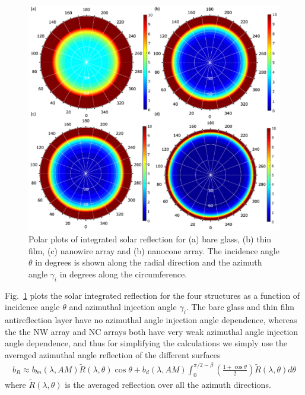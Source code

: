\documentclass[preprint,12pt]{elsarticle}
\begin{document}

\begin{figure}[H]
\vspace{-10pt}
 \centering
 \includegraphics[width=13cm]{AzimuthReflection}
\caption{Polar plots of integrated solar reflection for (a) bare glass, (b) thin film, (c) nanowire array and (b) nanocone array.  
The incidence angle $\theta$ in degrees is shown along the radial direction and the azimuth angle $\gamma_i$ in degrees along the circumference.   }
 \label{fig:AzimuthReflection}
 \end{figure}
 
 Fig.~\ref{fig:AzimuthReflection} plots the solar integrated reflection for the four structures as a function of incidence angle $\theta$ and 
 azimuthal injection angle $\gamma_i$.  
 The bare glass and thin film antireflection layer have no azimuthal angle injection angle dependence, whereas the 
 the NW array and NC arrays both have very weak azimuthal angle injection angle dependence, and thus for simplifying the calculations
 we simply use the averaged azimuthal angle reflection of the different surfaces
\begin{multline}
b_{R} \approx  b_{bn} (\lambda, AM) \tilde{R}(\lambda, \theta) \cos \theta +  b_d (\lambda, AM) \int_{0}^{\pi/2 - \beta} \left ( \frac{1 + \cos \theta}{2} \right ) \tilde{R}(\lambda, \theta) d \theta
\end{multline}
where $\tilde{R}(\lambda, \theta)$ is the averaged reflection over all the azimuth directions.  
\end{document}
